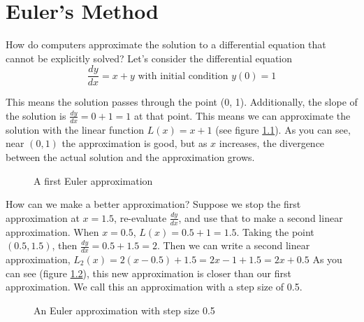 \chapter{Euler's Method}

How do computers approximate the solution to a differential equation that 
cannot be explicitly solved? Let's consider the differential equation 
$$\frac{dy}{dx} = x + y \text{ with initial condition } y(0) = 1$$

This means the solution passes through the point (0, 1). Additionally, the 
slope of the solution is $\frac{dy}{dx} = 0 + 1 = 1$ at that point. This means 
we can approximate the solution with the linear function $L(x) = x + 1$ (see 
figure \ref{fig:euler1}). As you can see, near $(0,1)$ the approximation is 
good, but as $x$ increases, the divergence between the actual solution and the 
approximation grows. 

\begin{figure}[htbp]
\centering
{}
\caption{A first Euler approximation}
\label{fig:euler1}
\end{figure}

How can we make a better approximation? Suppose we stop the first 
approximation at $x = 1.5$, re-evaluate $\frac{dy}{dx}$, and use that to make 
a second linear approximation. When $x = 0.5$, $L(x) = 0.5 + 1 = 1.5$. Taking 
the point $(0.5, 1.5)$, then $\frac{dy}{dx} = 0.5 + 1.5 = 2$. Then we can 
write a second linear approximation, $L_2(x) = 2(x - 0.5) + 1.5 = 2x - 1 + 1.5 
= 2x + 0.5$ As you can see (figure \ref{fig:euler2}), this new approximation 
is closer than our first approximation. We call this an approximation with a 
step size of 0.5.

\begin{figure}[htbp]
\centering
{}
\caption{An Euler approximation with step size 0.5}
\label{fig:euler2}
\end{figure}

